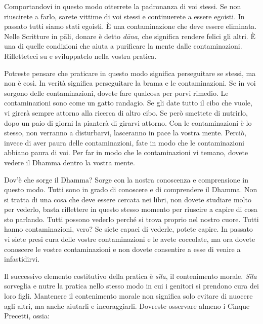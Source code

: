 Comportandovi in questo modo otterrete la padronanza di voi stessi. Se
non riuscirete a farlo, sarete vittime di voi stessi e continuerete a
essere egoisti. In passato tutti siamo stati egoisti. È una
contaminazione che deve essere eliminata. Nelle Scritture in pāli,
donare è detto \emph{dāna}, che significa rendere felici gli altri. È
una di quelle condizioni che aiuta a purificare la mente dalle
contaminazioni. Rifletteteci su e sviluppatelo nella vostra pratica.

Potreste pensare che praticare in questo modo significa perseguitare se
stessi, ma non è così. In verità significa perseguitare la brama e le
contaminazioni. Se in voi sorgono delle contaminazioni, dovete fare
qualcosa per porvi rimedio. Le contaminazioni sono come un gatto
randagio. Se gli date tutto il cibo che vuole, vi girerà sempre attorno
alla ricerca di altro cibo. Se però smettete di nutrirlo, dopo un paio
di giorni la pianterà di girarvi attorno. Con le contaminazioni è lo
stesso, non verranno a disturbarvi, lasceranno in pace la vostra mente.
Perciò, invece di aver paura delle contaminazioni, fate in modo che le
contaminazioni abbiano paura di voi. Per far in modo che le
contaminazioni vi temano, dovete vedere il Dhamma dentro la vostra
mente.

Dov'è che sorge il Dhamma? Sorge con la nostra conoscenza e comprensione
in questo modo. Tutti sono in grado di conoscere e di comprendere il
Dhamma. Non si tratta di una cosa che deve essere cercata nei libri, non
dovete studiare molto per vederlo, basta riflettere in questo stesso
momento per riuscire a capire di cosa sto parlando. Tutti possono
vederlo perché si trova proprio nel nostro cuore. Tutti hanno
contaminazioni, vero? Se siete capaci di vederle, potete capire. In
passato vi siete presi cura delle vostre contaminazioni e le avete
coccolate, ma ora dovete conoscere le vostre contaminazioni e non dovete
consentire a esse di venire a infastidirvi.

Il successivo elemento costitutivo della pratica è \emph{sīla}, il
contenimento morale. \emph{Sīla} sorveglia e nutre la pratica nello
stesso modo in cui i genitori si prendono cura dei loro figli. Mantenere
il contenimento morale non significa solo evitare di nuocere agli altri,
ma anche aiutarli e incoraggiarli. Dovreste osservare almeno i Cinque
Precetti, ossia:

